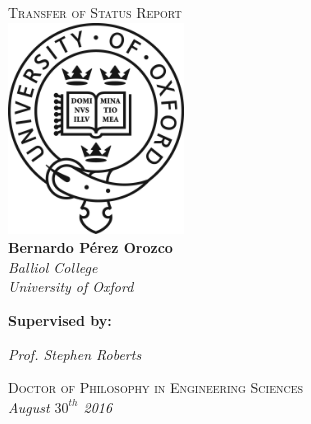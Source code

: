 \begin{titlepage} 
\begin{center}


\textsc{\LARGE Transfer of Status Report}\\[2cm]
\includegraphics[width=0.35\textwidth]{./figs/logo.png}\\[2cm]

{
\Large 
\textbf{Bernardo Pérez Orozco}\\
\textsl{Balliol College\\
University of Oxford\\}
}
\vspace{15mm}
{
\Large
\par\textbf{Supervised by:}
\par\textsl{Prof. Stephen Roberts}
\vfill
}
{\large 
\textsc{Doctor of Philosophy in Engineering Sciences\\}
}
{\large
\textsl{August $30^{th}$ 2016}
}

\end{center} 
\end{titlepage}